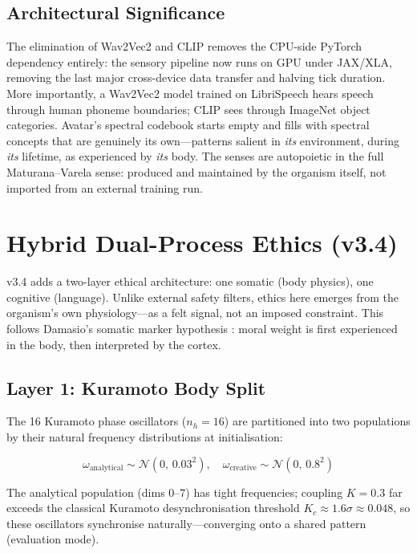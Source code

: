\documentclass[11pt,a4paper,twocolumn]{article}
\begin{document}
\subsection{Architectural Significance}

The elimination of Wav2Vec2 and CLIP removes the CPU-side PyTorch dependency entirely:
the sensory pipeline now runs on GPU under JAX/XLA, removing the last major cross-device
data transfer and halving tick duration. More importantly, a Wav2Vec2 model trained on
LibriSpeech hears speech through human phoneme boundaries; CLIP sees through ImageNet
object categories. Avatar's spectral codebook starts empty and fills with spectral
concepts that are genuinely its own---patterns salient in \emph{its} environment, during
\emph{its} lifetime, as experienced by \emph{its} body. The senses are autopoietic in the
full Maturana--Varela sense: produced and maintained by the organism itself, not imported
from an external training run.

\section{Hybrid Dual-Process Ethics (v3.4)}
\label{sec:dualprocess}

v3.4 adds a two-layer ethical architecture: one somatic (body physics), one cognitive (language).
Unlike external safety filters, ethics here emerges from the organism's own physiology---as a
felt signal, not an imposed constraint. This follows Damasio's somatic marker hypothesis
\citep{damasio1999}: moral weight is first experienced in the body, then interpreted by the cortex.

\subsection{Layer 1: Kuramoto Body Split}

The 16 Kuramoto phase oscillators ($n_h = 16$) are partitioned into two populations by their
natural frequency distributions at initialisation:

\begin{equation}
\omega_{\text{analytical}} \sim \mathcal{N}(0,\, 0.03^2), \quad
\omega_{\text{creative}} \sim \mathcal{N}(0,\, 0.8^2)
\end{equation}

The analytical population (dims $0$--$7$) has tight frequencies; coupling $K = 0.3$ far exceeds
the classical Kuramoto desynchronisation threshold $K_c \approx 1.6\sigma \approx 0.048$, so these
oscillators synchronise naturally---converging onto a shared pattern (evaluation mode).
\end{document}
